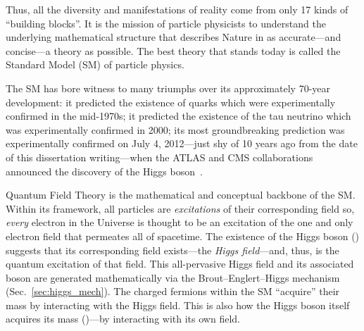 Thus, all the diversity and manifestations of reality come from only 17 kinds of ``building blocks''.
It is the mission of particle physicists to understand the underlying mathematical structure that describes Nature in as accurate---and concise---a theory as possible.
The best theory that stands today is called the Standard Model (SM) of particle physics.

The SM has bore witness to many triumphs over its approximately 70-year development:
it predicted the existence of quarks which were experimentally confirmed in the mid-1970s;
it predicted the existence of the tau neutrino which was experimentally confirmed in 2000;
its most groundbreaking prediction was experimentally confirmed on July 4, 2012---just shy of 10 years ago from the date of this dissertation writing---when the ATLAS and CMS collaborations announced the discovery of the Higgs boson~\cite{chatrchyan_observation_2012, ATLAS:2012yve, chatrchyan_observation_2013}.

Quantum Field Theory is the mathematical and conceptual backbone of the SM.
Within its framework, all particles are \emph{excitations} of their corresponding field so, \eg \emph{every} electron in the Universe is thought to be an excitation of the one and only electron field that permeates all of spacetime.
The existence of the Higgs boson (\PH) suggests that its corresponding field exists---the \emph{Higgs field}---and, thus, \PH is the quantum excitation of that field.
This all-pervasive Higgs field and its associated boson are generated mathematically via the Brout--Englert--Higgs mechanism (Sec.~\ref{sec:higgs_mech}).
The charged fermions within the SM ``acquire'' their mass by interacting with the Higgs field.
This is also how the Higgs boson itself acquires its mass (\mH)---by interacting with its own field.

